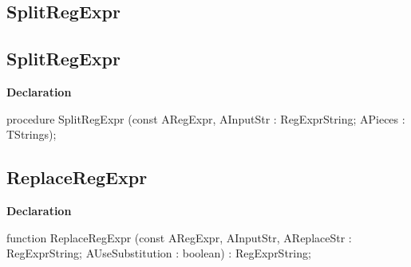 \documentclass{report}
\newif\ifpdf
\begin{document}
\subsection*{\large{\textbf{SplitRegExpr}}\normalsize\hspace{1ex}\hrulefill}
\else
\subsection*{SplitRegExpr}
\fi
\label{RegExpr-SplitRegExpr}
\begin{list}{}{
\setlength{\itemindent}{0cm}
\setlength{\listparindent}{0cm}
\setlength{\leftmargin}{\evensidemargin}
\addtolength{\leftmargin}{\tmplength}
\settowidth{\labelsep}{X}
\addtolength{\leftmargin}{\labelsep}
\setlength{\labelwidth}{\tmplength}
}
\item[\textbf{Declaration}\hfill]
\ifpdf
\begin{flushleft}
\fi
\begin{ttfamily}
procedure SplitRegExpr (const ARegExpr, AInputStr : RegExprString; APieces : TStrings);\end{ttfamily}

\ifpdf
\end{flushleft}
\fi

\end{list}
\ifpdf
\subsection*{\large{\textbf{ReplaceRegExpr}}\normalsize\hspace{1ex}\hrulefill}
\else
\subsection*{ReplaceRegExpr}
\fi
\label{RegExpr-ReplaceRegExpr}
\begin{list}{}{
\setlength{\itemindent}{0cm}
\setlength{\listparindent}{0cm}
\setlength{\leftmargin}{\evensidemargin}
\addtolength{\leftmargin}{\tmplength}
\settowidth{\labelsep}{X}
\addtolength{\leftmargin}{\labelsep}
\setlength{\labelwidth}{\tmplength}
}
\item[\textbf{Declaration}\hfill]
\ifpdf
\begin{flushleft}
\fi
\begin{ttfamily}
function ReplaceRegExpr (const ARegExpr, AInputStr, AReplaceStr : RegExprString; AUseSubstitution : boolean) : RegExprString;\end{ttfamily}

\ifpdf
\end{flushleft}
\fi

\end{list}
\ifpdf
\end{document}
